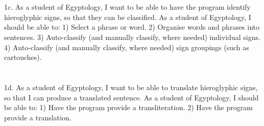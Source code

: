 \documentclass{article}
\begin{document}
\paragraph{} ~\\ \noindent
1c. As a student of Egyptology, I want to be able to have the program identify hieroglyphic signs, so that they can be classified.
\newline \break \noindent
As a student of Egyptology, I should be able to: 1) Select a phrase or word. 2) Organise words and phrases into sentences. 3) Auto-classify (and manually classify, where needed) individual signs. 4) Auto-classify (and manually classify, where needed) sign groupings (such as cartouches).
\paragraph{} ~\\ \noindent
1d. As a student of Egyptology, I want to be able to translate hieroglyphic signs, so that I can produce a translated sentence.
\newline \break \noindent
As a student of Egyptology, I should be able to: 1) Have the program provide a transliteration. 2) Have the program provide a translation.
\end{document}
